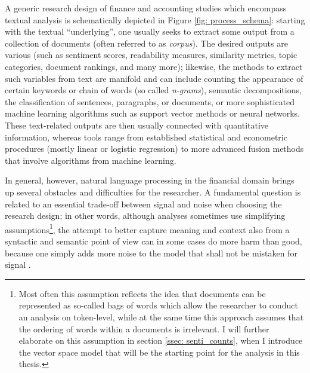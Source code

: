 A generic research design of finance and accounting studies which encompass textual analysis is schematically depicted in Figure \ref{fig: process_schema}: starting with the textual \enquote{underlying}, one usually seeks to extract some output from a collection of documents (often referred to as \textit{corpus}). The desired outputs are various (such as sentiment scores, readability measures, similarity metrics, topic categories, document rankings, and many more); likewise, the methods to extract such variables from text are manifold and can include counting the appearance of certain keywords or chain of words (so called \textit{n-grams}), semantic decompositions, the classification of sentences, paragraphs, or documents, or more sophisticated machine learning algorithms such as support vector methods or neural networks. These text-related outputs are then usually connected with quantitative information, whereas tools range from established statistical and econometric procedures (mostly linear or logistic regression) to more advanced fusion methods that involve algorithms from machine learning.

In general, however, natural language processing in the financial domain brings up several obstacles and difficulties for the researcher. A fundamental question is related to an essential trade-off between signal and noise when choosing the research design; in other words, although analyses sometimes use simplifying assumptions\footnote{Most often this assumption reflects the idea that documents can be represented as so-called bags of words which allow the researcher to conduct an analysis on token-level, while at the same time this approach assumes that the ordering of words within a documents is irrelevant. I will further elaborate on this assumption in section \ref{ssec: senti_counts}, when I introduce the vector space model that will be the starting point for the analysis in this thesis.}, the attempt to better capture meaning and context also from a syntactic and semantic point of view can in some cases do more harm than good, because one simply adds more noise to the model that shall not be mistaken for signal \parencite{LM-meta-2016}. 

